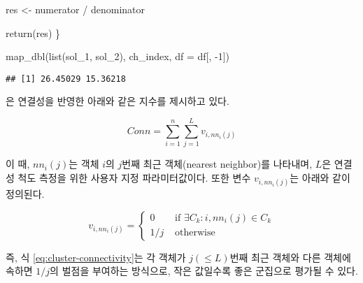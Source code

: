 \documentclass[
]{book}
\newenvironment{Shaded}{\begin{snugshade}}{\end{snugshade}}
\newcommand{\AttributeTok}[1]{\textcolor[rgb]{0.77,0.63,0.00}{#1}}
\newcommand{\DecValTok}[1]{\textcolor[rgb]{0.00,0.00,0.81}{#1}}
\newcommand{\FunctionTok}[1]{\textcolor[rgb]{0.00,0.00,0.00}{#1}}
\newcommand{\NormalTok}[1]{#1}
\newcommand{\OtherTok}[1]{\textcolor[rgb]{0.56,0.35,0.01}{#1}}
\newcommand{\SpecialCharTok}[1]{\textcolor[rgb]{0.00,0.00,0.00}{#1}}
\begin{document}
\begin{Shaded}
\begin{Highlighting}[]
\NormalTok{  res }\OtherTok{\textless{}{-}}\NormalTok{ numerator }\SpecialCharTok{/}\NormalTok{ denominator}
  
  \FunctionTok{return}\NormalTok{(res)}
\NormalTok{\}}

\FunctionTok{map\_dbl}\NormalTok{(}\FunctionTok{list}\NormalTok{(sol\_1, sol\_2), ch\_index, }\AttributeTok{df =}\NormalTok{ df[, }\SpecialCharTok{{-}}\DecValTok{1}\NormalTok{])}
\end{Highlighting}
\end{Shaded}

\begin{verbatim}
## [1] 26.45029 15.36218
\end{verbatim}

\citet{handl2005exploiting} 은 연결성을 반영한 아래와 같은 지수를 제시하고 있다.

\begin{equation}
Conn = \sum_{i = 1}^{n} \sum_{j = 1}^{L} v_{i, nn_{i}(j)} \label{eq:cluster-connectivity}
\end{equation}

이 때, \(nn_{i}(j)\)는 객체 \(i\)의 \(j\)번째 최근 객체(nearest neighbor)를 나타내며, \(L\)은 연결성 척도 측정을 위한 사용자 지정 파라미터값이다. 또한 변수 \(v_{i, nn_i(j)}\)는 아래와 같이 정의된다.

\begin{equation*}
v_{i, nn_i(j)} = \begin{cases}
0 & \text{ if } \exists C_k : i, nn_i(j) \in C_k \\
1 / j & \text{ otherwise} 
\end{cases}
\end{equation*}

즉, 식 \eqref{eq:cluster-connectivity}는 각 객체가 \(j (\leq L)\)번째 최근 객체와 다른 객체에 속하면 \(1 / j\)의 벌점을 부여하는 방식으로, 작은 값일수록 좋은 군집으로 평가될 수 있다.
\end{document}
